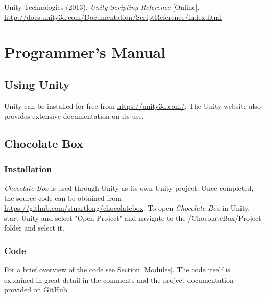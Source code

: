 \documentclass[pdftex,12pt,letter]{article}
\begin{document}
\begin{thebibliography}{3}
Unity Technologies (2013). \textit{Unity Scripting Reference} [Online]. \url{http://docs.unity3d.com/Documentation/ScriptReference/index.html}
\end{thebibliography}

\newpage
\appendix
\section{Programmer's Manual}
\subsection{Using Unity}
Unity can be installed for free from \url{https://unity3d.com/}. The Unity website also provides extensive documentation on its use.
\subsection{Chocolate Box}
\subsubsection{Installation}
\textit{Chocolate Box} is used through Unity as its own Unity project. Once completed, the source code can be obtained from \url{https://github.com/stuartlong/chocolatebox}. To open \textit{Chocolate Box} in Unity, start Unity and select "Open Project" and navigate to the /ChocolateBox/Project folder and select it.
\subsubsection{Code}
For a brief overview of the code see Section \ref{Modules}. The code itself is explained in great detail in the comments and the project documentation provided on GitHub.

\FloatBarrier
\end{document}
